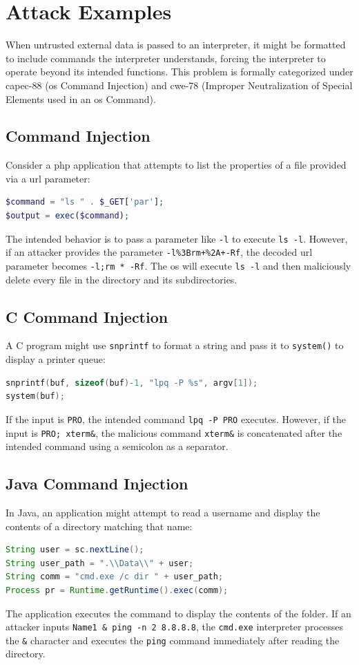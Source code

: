 \section{Attack Examples}

When untrusted external data is passed to an interpreter, it might be formatted to include commands the interpreter understands, forcing the interpreter to operate beyond its intended functions. This problem is formally categorized under \gls{capec}-88 (\gls{os} Command Injection) and \gls{cwe}-78 (Improper Neutralization of Special Elements used in an \gls{os} Command).

\subsection{ Command Injection}
Consider a \gls{php} application that attempts to list the properties of a file provided via a \gls{url} parameter:
\begin{lstlisting}[language=PHP]
$command = "ls " . $_GET['par'];
$output = exec($command);
\end{lstlisting}
The intended behavior is to pass a parameter like \texttt{-l} to execute \texttt{ls -l}. However, if an attacker provides the parameter \texttt{-l\%3Brm+\%2A+-Rf}, the decoded \gls{url} parameter becomes \texttt{-l;rm * -Rf}. The \gls{os} will execute \texttt{ls -l} and then maliciously delete every file in the directory and its subdirectories.

\subsection{C Command Injection}
A C program might use \texttt{snprintf} to format a string and pass it to \texttt{system()} to display a printer queue:
\begin{lstlisting}[language=C]
snprintf(buf, sizeof(buf)-1, "lpq -P %s", argv[1]);
system(buf);
\end{lstlisting}
If the input is \texttt{PRO}, the intended command \texttt{lpq -P PRO} executes. However, if the input is \texttt{PRO; xterm\&}, the malicious command \texttt{xterm\&} is concatenated after the intended command using a semicolon as a separator.

\subsection{Java Command Injection}
In Java, an application might attempt to read a username and display the contents of a directory matching that name:
\begin{lstlisting}[language=Java]
String user = sc.nextLine();
String user_path = ".\\Data\\" + user;
String comm = "cmd.exe /c dir " + user_path;
Process pr = Runtime.getRuntime().exec(comm);
\end{lstlisting}
The application executes the command to display the contents of the folder. If an attacker inputs \texttt{Name1 \& ping -n 2 8.8.8.8}, the \texttt{cmd.exe} interpreter processes the \texttt{\&} character and executes the \texttt{ping} command immediately after reading the directory.


